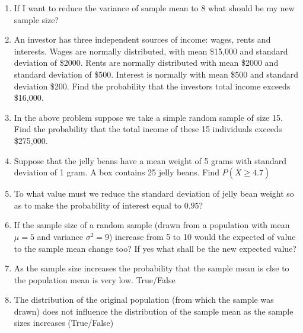 \documentclass{article}
\begin{document}
\begin{enumerate}
\item If I want to reduce the variance of sample mean to 8 what should be my new sample size?
\vspace{5cm}

\item An investor has three independent sources of income: wages, rents and interests. Wages are normally distributed, with mean \$15,000 and standard deviation of \$2000. Rents are normally distributed with mean \$2000 and standard deviation of \$500. Interest is normally with mean \$500 and standard deviation \$200.  Find the probability that the investors total income exceeds \$16,000.

\vspace{5cm}

\item In the above problem suppose we take a simple random sample of size 15. Find the probability that the total income of these 15 individuals exceeds \$275,000.

\vspace{5cm}

\item Suppose that the jelly beans have a mean weight of 5 grams with standard deviation of 1 gram. A box contains 25 jelly beans. Find $P(\bar{X}\geq 4.7)$

\vspace{5cm}

\item To what value must we reduce the standard deviation of jelly bean weight so as to make the probability of interest equal to $0.95$?

\vspace{5cm}

\item If the sample size of a random sample (drawn from a population with mean $\mu=5$ and variance $\sigma^2=9$) increase from 5 to 10 would the expected of value to the sample mean change too? If yes what shall be the new expected value?

\vspace{5cm}

\item As the sample size increases the probability that the sample mean is clse to the population mean is very low. True/False
\vspace{5cm}

\item The distribution of the original population (from which the sample was drawn) does not influence the distribution of the sample mean as the sample sizes increases (True/False)

\end{enumerate}
\end{document}
